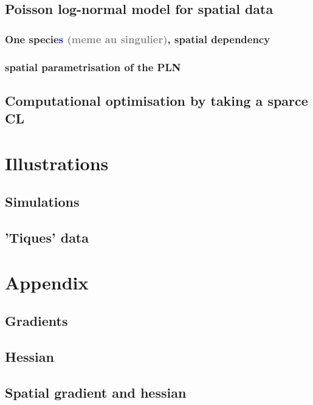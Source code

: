\documentclass[11pt, a4paper]{article}
\newcommand{\SR}[2]{\textcolor{gray}{#1}\textcolor{blue}{#2}}
\begin{document}
\subsection{Poisson log-normal model for spatial data}
\subsubsection{One specie\SR{}{s} \SR{(meme au singulier)}{}, spatial dependency}
\subsubsection{spatial parametrisation of the PLN}
\subsection{Computational optimisation by taking a sparce CL}

\section{Illustrations}
\subsection{Simulations}
\subsection{'Tiques' data}

\appendix
\section{Appendix}
\subsection{Gradients}
\subsection{Hessian}
\subsection{Spatial gradient and hessian}
\end{document}
